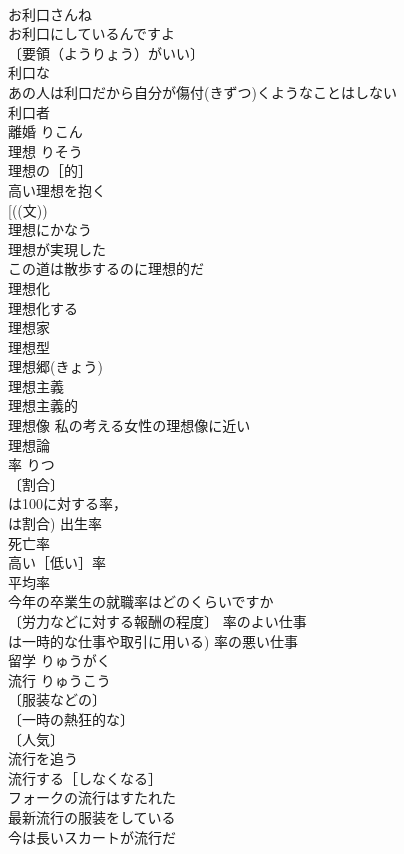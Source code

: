 \documentclass[8pt]{extreport}
\begin{document}
\begin{CJK}{UTF8}{min}
\\	お利口さんね 
\\	お利口にしているんですよ 
\\	〔要領（ようりょう）がいい〕 
\\	利口な 
\\	あの人は利口だから自分が傷付(きずつ)くようなことはしない 
\\	利口者 
\\	離婚	りこん	
\\	理想	りそう	
\\	理想の［的］ 
\\	高い理想を抱く 
\\	[((文)) 
\\	理想にかなう 
\\	理想が実現した 
\\	この道は散歩するのに理想的だ 
\\	理想化 
\\	理想化する 
\\	理想家 
\\	理想型 
\\	理想郷(きょう) 
\\	理想主義 
\\	理想主義的 
\\	理想像 私の考える女性の理想像に近い 
\\	理想論 
\\	率	りつ	
\\	〔割合〕
\\	は100に対する率，
\\	は割合) 出生率 
\\	死亡率 
\\	高い［低い］率 
\\	平均率 
\\	今年の卒業生の就職率はどのくらいですか 
\\	〔労力などに対する報酬の程度〕 率のよい仕事 
\\	は一時的な仕事や取引に用いる) 率の悪い仕事 
\\	留学	りゅうがく	
\\	流行	りゅうこう	
\\	〔服装などの〕
\\	〔一時の熱狂的な〕
\\	〔人気〕
\\	流行を追う 
\\	流行する［しなくなる］ 
\\	フォークの流行はすたれた 
\\	最新流行の服装をしている 
\\	今は長いスカートが流行だ 

\end{CJK}
\end{document}
